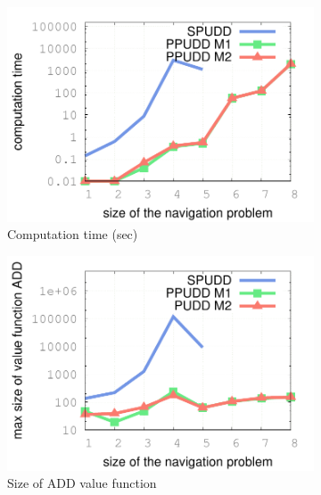 \begin{figure}\centering
\begin{subfigure}[t]{.48\linewidth}
\includegraphics[width=\linewidth]{courbeTime.pdf}
\caption{Computation time (sec)}
\label{navigCT}
\end{subfigure}
\begin{subfigure}[t]{.48\linewidth}
\includegraphics[width=\linewidth]{courbeADD.pdf}
\caption{Size of ADD value function}
\label{navigADD}
\end{subfigure}\\
\vspace{0.5cm}
\begin{subfigure}[b]{.48\linewidth}

\end{subfigure}
\end{figure}
